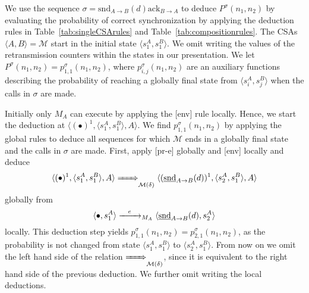 \documentclass{sig-alternate}
\newcommand{\M}{\mathcal{M}}
\newcommand{\locev}[1]{\underline{#1}}
\newcommand{\snd}{\mathrm{snd}}
\newcommand{\ack}{\mathrm{ack}}
\newcommand{\env}[4]{\locev{#1}_{{#2} \rightarrow {#3}}(#4)}
\newcommand{\tab}[1]{Table~\ref{tab:#1}}
\begin{document}
We use the sequence $\sigma = \snd_{A \rightarrow B}(d)\ack_{B \rightarrow A}$ to deduce $P^{\sigma}(n_1, n_2)$ by evaluating the probability of correct synchronization by applying the deduction rules in \tab{singleCSArules} and \tab{compositionrules}. The CSAs $\langle A, B \rangle = \M$ start in the initial state $\langle s^A_1, s^B_1 \rangle$. We omit writing the values of the retransmission counters within the states in our presentation. We let $P^{\sigma}(n_1, n_2) = p^{\sigma}_{1, 1}(n_1, n_2)$, where $p^{\sigma}_{i, j}(n_1, n_2)$ are an auxiliary functions describing the probability of reaching a globally final state from $\langle s^A_i, s^B_j \rangle$ when the calls in $\sigma$ are made.

Initially only $M_A$ can execute by applying the [env] rule locally. Hence, we start the deduction at $\langle (\bullet)^1, \langle s^A_1, s^B_1 \rangle, A \rangle$. We find $p^{\sigma}_{1, 1}(n_1, n_2)$ by applying the global rules to deduce all sequences for which $\M$ ends in a globally final state and the calls in $\sigma$ are made. First, apply [pr-e] globally and [env] locally and deduce
\begin{equation*}
	\langle (\bullet)^1, \langle s^A_1, s^B_1 \rangle, A \rangle \bigstep{} \langle (\env{\snd}{A}{B}{d})^1, \langle s^A_2, s^B_1 \rangle, A \rangle
\end{equation*}
globally from
\begin{equation*}
	\langle \bullet, s^A_1 \rangle \smallstep{e}{A} \langle \env{\snd}{A}{B}{d}, s^A_2 \rangle
\end{equation*}
locally. This deduction step yields $p^{\sigma}_{1, 1}(n_1, n_2) = p^{\sigma}_{2, 1}(n_1, n_2)$, as the probability is not changed from state $\langle s^A_1, s^B_1 \rangle$ to $\langle s^A_2, s^B_1 \rangle$. From now on we omit the left hand side of the relation $\bigstep{}$, since it is equivalent to the right hand side of the previous deduction. We further omit writing the local deductions.
\end{document}
